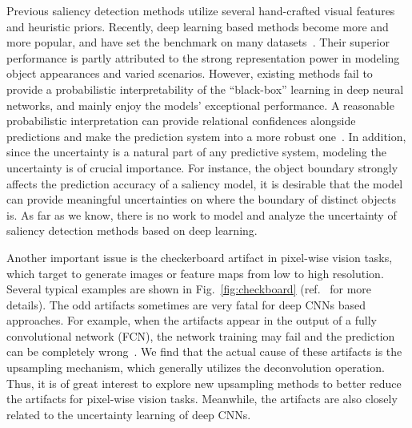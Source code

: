 \documentclass[10pt,twocolumn,letterpaper]{article}
\begin{document}
Previous saliency detection methods utilize several hand-crafted visual features and heuristic priors.
Recently, deep learning based methods become more and more popular, and have set the benchmark on many datasets~\cite{li2014secrets,yang2013saliency,borji2015salient}.
Their superior performance is partly attributed to the strong representation power in modeling object appearances and varied scenarios.
However, existing methods fail to provide a probabilistic interpretability of the ``black-box'' learning in deep neural networks, and mainly enjoy the models' exceptional performance.
A reasonable probabilistic interpretation can provide relational confidences alongside predictions and make the prediction system into a more robust one~\cite{gal2015dropout}.
In addition, since the uncertainty is a natural part of any predictive system, modeling the uncertainty is of crucial importance.
For instance, the object boundary strongly affects the prediction accuracy of a saliency model, it is desirable that the model can provide meaningful uncertainties on where the boundary of distinct objects is.
As far as we know, there is no work to model and analyze the uncertainty of saliency detection methods based on deep learning.


Another important issue is the checkerboard artifact in pixel-wise vision tasks,
which target to generate images or feature maps from low to high resolution.
Several typical examples are shown in Fig.~\ref{fig:checkboard} (ref.~\cite{odena2016deconvolution} for more details).
The odd artifacts sometimes are very fatal for deep CNNs based approaches.
For example, when the artifacts appear in the output of a fully convolutional network (FCN), the network training may fail and the prediction can be completely wrong~\cite{Shi_2016_CVPR}.
We find that the actual cause of these artifacts is the upsampling mechanism, which generally utilizes the deconvolution operation.
Thus, it is of great interest to explore new upsampling methods to better reduce the artifacts for pixel-wise vision tasks. Meanwhile, the artifacts are also closely related to the uncertainty learning of deep CNNs.
\end{document}
